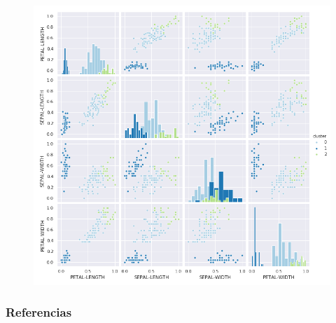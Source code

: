 \documentclass[spanish]{beamer}
\begin{document}
\begin{frame}
\begin{figure}[h]
\centering
\includegraphics[scale=0.34]{dani/scatmatrixMeanShiftIRIS.png}
\end{figure}
\end{frame}

\begin{frame}
  \frametitle{Referencias}
        
        
\end{frame}
\end{document}
